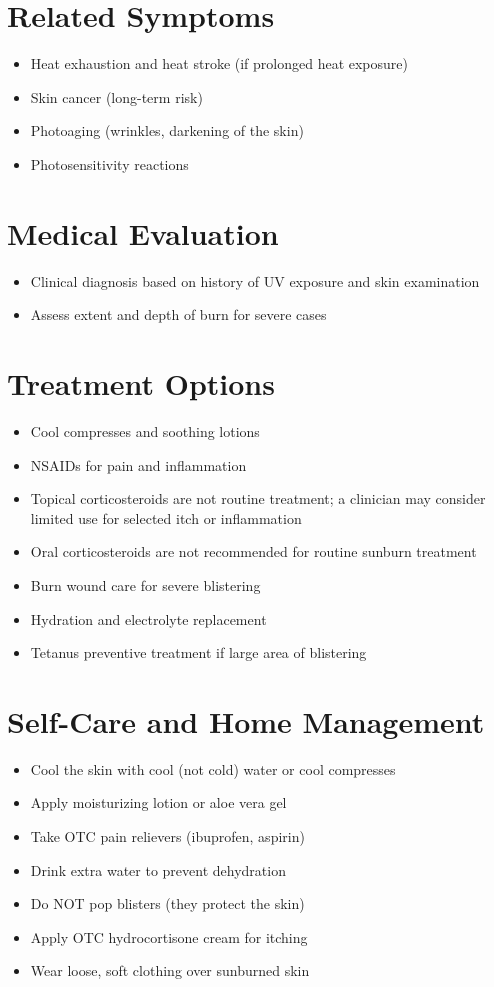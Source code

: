 \section*{Related Symptoms}
\begin{itemize}
\item Heat exhaustion and heat stroke (if prolonged heat exposure)
\item Skin cancer (long-term risk)
\item Photoaging (wrinkles, darkening of the skin)
\item Photosensitivity reactions
\end{itemize}

\section*{Medical Evaluation}
\begin{itemize}
\item Clinical diagnosis based on history of UV exposure and skin examination
\item Assess extent and depth of burn for severe cases
\end{itemize}

\section*{Treatment Options}
\begin{itemize}
\item Cool compresses and soothing lotions
\item NSAIDs for pain and inflammation
\item Topical corticosteroids are not routine treatment; a clinician may consider limited use for selected itch or inflammation
\item Oral corticosteroids are not recommended for routine sunburn treatment
\item Burn wound care for severe blistering
\item Hydration and electrolyte replacement
\item Tetanus preventive treatment if large area of blistering
\end{itemize}

\section*{Self-Care and Home Management}
\begin{itemize}
\item Cool the skin with cool (not cold) water or cool compresses
\item Apply moisturizing lotion or aloe vera gel
\item Take OTC pain relievers (ibuprofen, aspirin)
\item Drink extra water to prevent dehydration
\item Do NOT pop blisters (they protect the skin)
\item Apply OTC hydrocortisone cream for itching
\item Wear loose, soft clothing over sunburned skin
\end{itemize}

